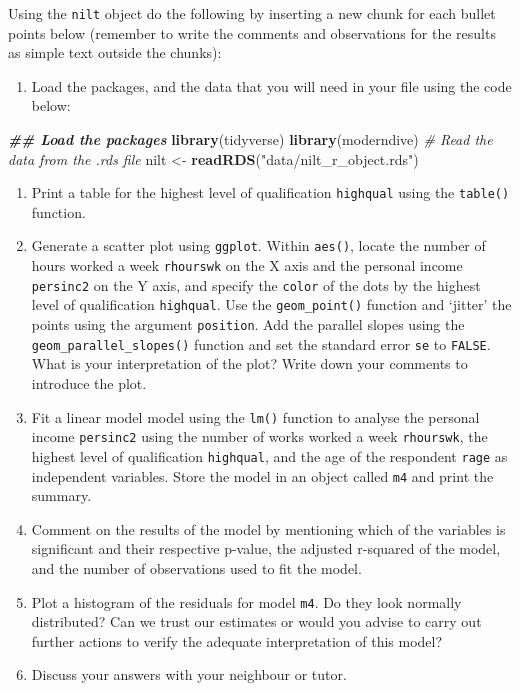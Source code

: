 \documentclass[
]{book}
\newenvironment{Shaded}{\begin{snugshade}}{\end{snugshade}}
\newcommand{\CommentTok}[1]{\textcolor[rgb]{0.56,0.35,0.01}{\textit{#1}}}
\newcommand{\DocumentationTok}[1]{\textcolor[rgb]{0.56,0.35,0.01}{\textbf{\textit{#1}}}}
\newcommand{\FunctionTok}[1]{\textcolor[rgb]{0.13,0.29,0.53}{\textbf{#1}}}
\newcommand{\NormalTok}[1]{#1}
\newcommand{\OtherTok}[1]{\textcolor[rgb]{0.56,0.35,0.01}{#1}}
\newcommand{\StringTok}[1]{\textcolor[rgb]{0.31,0.60,0.02}{#1}}
\providecommand{\tightlist}{%
  \setlength{\itemsep}{0pt}\setlength{\parskip}{0pt}}
\begin{document}
Using the \texttt{nilt} object do the following by inserting a new chunk for each bullet points below (remember to write the comments and observations for the results as simple text outside the chunks):

\begin{enumerate}
\def\labelenumi{\arabic{enumi}.}
\tightlist
\item
  Load the packages, and the data that you will need in your file using the code below:
\end{enumerate}

\begin{Shaded}
\begin{Highlighting}[]
\DocumentationTok{\#\# Load the packages}
\FunctionTok{library}\NormalTok{(tidyverse)}
\FunctionTok{library}\NormalTok{(moderndive)}
\CommentTok{\# Read the data from the .rds file}
\NormalTok{nilt }\OtherTok{\textless{}{-}} \FunctionTok{readRDS}\NormalTok{(}\StringTok{"data/nilt\_r\_object.rds"}\NormalTok{)}
\end{Highlighting}
\end{Shaded}

\begin{enumerate}
\def\labelenumi{\arabic{enumi}.}
\setcounter{enumi}{1}
\tightlist
\item
  Print a table for the highest level of qualification \texttt{highqual} using the \texttt{table()} function.
\item
  Generate a scatter plot using \texttt{ggplot}. Within \texttt{aes()}, locate the number of hours worked a week \texttt{rhourswk} on the X axis and the personal income \texttt{persinc2} on the Y axis, and specify the \texttt{color} of the dots by the highest level of qualification \texttt{highqual}. Use the \texttt{geom\_point()} function and `jitter' the points using the argument \texttt{position}. Add the parallel slopes using the \texttt{geom\_parallel\_slopes()} function and set the standard error \texttt{se} to \texttt{FALSE}. What is your interpretation of the plot? Write down your comments to introduce the plot.
\item
  Fit a linear model model using the \texttt{lm()} function to analyse the personal income \texttt{persinc2} using the number of works worked a week \texttt{rhourswk}, the highest level of qualification \texttt{highqual}, and the age of the respondent \texttt{rage} as independent variables. Store the model in an object called \texttt{m4} and print the summary.
\item
  Comment on the results of the model by mentioning which of the variables is significant and their respective p-value, the adjusted r-squared of the model, and the number of observations used to fit the model.
\item
  Plot a histogram of the residuals for model \texttt{m4}. Do they look normally distributed? Can we trust our estimates or would you advise to carry out further actions to verify the adequate interpretation of this model?
\item
  Discuss your answers with your neighbour or tutor.
\end{enumerate}
\end{document}
